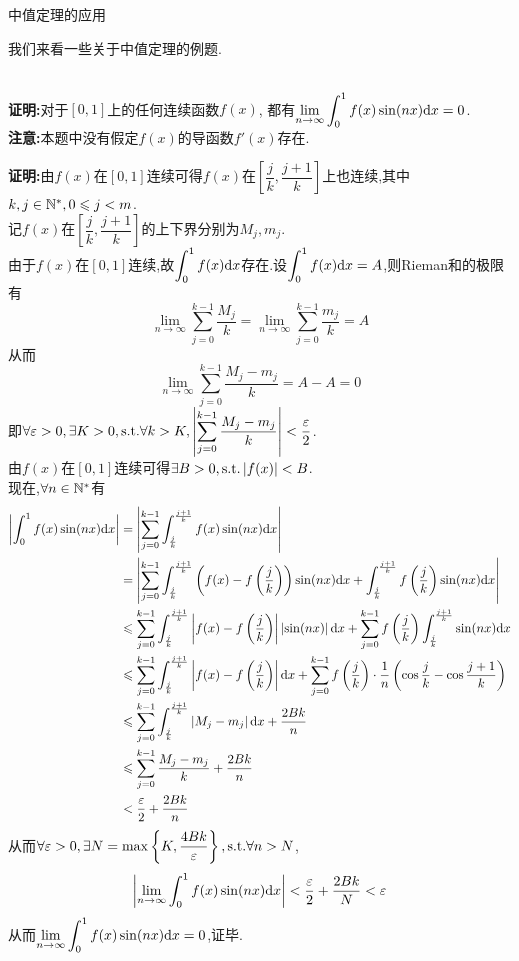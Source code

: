 \documentclass{ctexart}
\begin{document}
\pagestyle{empty}
\begin{center}\large 中值定理的应用\end{center}
我们来看一些关于中值定理的例题.
\begin{problem}
    \\
    \textbf{证明:}对于$[0,1]$上的任何连续函数$f(x)$,
    都有$\displaystyle\lim_{n\to\infty}{\int_{0}^{1}{f(x)\sin(nx)\mathrm{d} x}}=0$.\\
    \textbf{注意:}本题中没有假定$f(x)$的导函数$f'(x)$存在.
\end{problem}
\begin{solution}
    \textbf{证明:}由$f(x)$在$[0,1]$连续可得$f(x)$在$\left[\dfrac{j}{k},\dfrac{j+1}{k}\right]$上也连续,其中$k,j\in\mathbb{N}^*,0\leqslant j<m$.\\
    记$f(x)$在$\left[\dfrac{j}{k},\dfrac{j+1}{k}\right]$的上下界分别为$M_j,m_j$.\\
    由于$f(x)$在$[0,1]$连续,故$\displaystyle\int_{0}^{1}{f(x)\mathrm{d} x}$存在.设$\displaystyle\int_{0}^{1}{f(x)\mathrm{d} x}=A$,则Rieman和的极限有
    $$\lim_{n\to\infty}{\sum_{j=0}^{k-1}{\dfrac{M_j}{k}}}=\lim_{n\to\infty}{\sum_{j=0}^{k-1}{\dfrac{m_j}{k}}}=A$$
    从而$$\lim_{n\to\infty}{\sum_{j=0}^{k-1}{\dfrac{M_j-m_j}{k}}}=A-A=0$$
    即$\displaystyle\forall\varepsilon>0,\exists K>0,\text{s.t.}\forall k>K,\left|\sum_{j=0}^{k-1}{\dfrac{M_j-m_j}{k}}\right|<\dfrac{\varepsilon}{2}$.\\
    由$f(x)$在$[0,1]$连续可得$\exists B>0,\text{s.t.}\left|f(x)\right|<B$.\\
    现在,$\forall n\in\mathbb{N}^*$有
    $$\begin{aligned}
        \left|\int_{0}^{1}{f(x)\sin(nx)\mathrm{d} x}\right|
        &= \left|\sum_{j=0}^{k-1}{\int_{\frac{j}{k}}^{\frac{j+1}{k}}{f(x)\sin(nx)\mathrm{d} x}}\right| \\
        &= \left|\sum_{j=0}^{k-1}{\int_{\frac{j}{k}}^{\frac{j+1}{k}}{\left(f(x)-f\left(\dfrac{j}{k}\right)\right)\sin(nx)\mathrm{d} x}}+\int_{\frac{j}{k}}^{\frac{j+1}{k}}{f\left(\dfrac{j}{k}\right)\sin(nx)\mathrm{d} x}\right| \\
        &\leqslant \sum_{j=0}^{k-1}{\int_{\frac{j}{k}}^{\frac{j+1}{k}}{\left|f(x)-f\left(\dfrac{j}{k}\right)\right|\left|\sin(nx)\right|\mathrm{d} x}}+\sum_{j=0}^{k-1}{f\left(\dfrac{j}{k}\right)\int_{\frac{j}{k}}^{\frac{j+1}{k}}{\sin(nx)\mathrm{d} x}} \\
        &\leqslant \sum_{j=0}^{k-1}{\int_{\frac{j}{k}}^{\frac{j+1}{k}}{\left|f(x)-f\left(\dfrac{j}{k}\right)\right|\mathrm{d} x}}+\sum_{j=0}^{k-1}{f\left(\dfrac{j}{k}\right)\cdot\dfrac{1}{n}\left(\cos{\dfrac{j}{k}}-\cos{\dfrac{j+1}{k}}\right)} \\
        &\leqslant \sum_{j=0}^{k-1}{\int_{\frac{j}{k}}^{\frac{j+1}{k}}{\left|M_j-m_j\right|\mathrm{d} x}}+\dfrac{2Bk}{n} \\
        &\leqslant \sum_{j=0}^{k-1}{\dfrac{M_j-m_j}{k}}+\dfrac{2Bk}{n} \\
        &< \dfrac{\varepsilon}{2}+\dfrac{2Bk}{n}
    \end{aligned}$$
    从而$\forall\varepsilon>0,\exists N=\max\left\{K,\dfrac{4Bk}{\varepsilon}\right\},\text{s.t.}\forall n>N$,
    $$\left|\lim_{n\to\infty}{\int_{0}^{1}{f(x)\sin(nx)\mathrm{d} x}}\right|<\dfrac{\varepsilon}{2}+\dfrac{2Bk}{N}<\varepsilon$$
    从而$\displaystyle\lim_{n\to\infty}{\int_{0}^{1}{f(x)\sin(nx)\mathrm{d} x}}=0$,证毕.
\end{solution}\noindent
\end{document}
